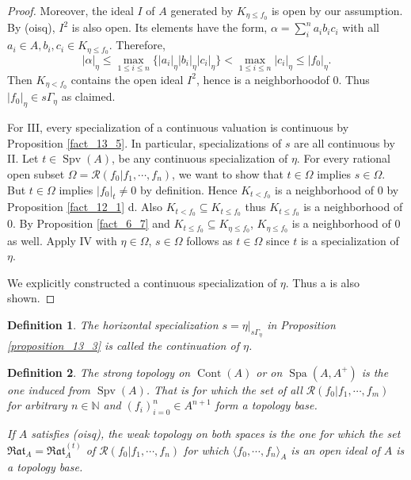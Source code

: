 \documentclass[8pt]{article}
\numberwithin{equation}{section}
\newtheorem{definition}{Definition}[subsection]
\DeclareMathOperator{\Spa}{Spa}
\DeclareMathOperator{\Spv}{Spv}
\DeclareMathOperator{\Cont}{Cont}
\newcommand{\N}[0]{\mathbb{N}}
\newcommand{\cR}[0]{\mathcal{R}}
\newcommand{\ab}[1]{\vert #1 \vert}
\newcommand{\Rat}[0]{\mathfrak{Rat}}
\begin{document}
\begin{proof}
    Moreover, the ideal $I$ of $A$ generated by $K_{\eta\leq f_0}$ is open by our assumption. By (oisq), $I^2$ is also open. Its elements have the form, $\alpha=\sum_i^n a_ib_ic_i$ with all $a_i\in A, b_i,c_i\in K_{\eta\leq f_0}$. Therefore,
    \begin{equation*}
        \ab{\alpha}_\eta\leq\max_{1\leq i\leq n}\{\ab{a_i}_\eta\ab{b_i}_\eta\ab{c_i}_\eta\}<\max_{1\leq i\leq n}\ab{c_i}_\eta\leq\ab{f_0}_\eta.
    \end{equation*}
    Then $K_{\eta<f_0}$ contains the open ideal $I^2$, hence is a neighborhoodof $0$. Thus $\ab{f_0}_\eta\in s\Gamma_\eta$ as claimed.
    \par For III, every specialization of a continuous valuation is continuous by Proposition \ref{fact_13_5}. In particular, specializations of $s$ are all continuous by II. 
    Let $t\in \Spv(A)$, be any continuous specialization of $\eta$. For every rational open subset $\Omega = \cR(f_0|f_1,\cdots,f_n)$, we want to show that $t\in\Omega$ implies $s\in\Omega$. But $t\in\Omega$ implies $\ab{f_0}_t\not=0$ by definition.
    Hence $K_{t< f_0}$ is a neighborhood of $0$ by Proposition \ref{fact_12_1} d. %
    Also $K_{t< f_0}\subseteq K_{t\leq f_0}$ thus $K_{t\leq f_0}$ is a neighborhood of $0$. By Proposition \ref{fact_6_7} and  $K_{t\leq f_0}\subseteq K_{\eta\leq f_0}$, $K_{\eta\leq f_0}$ is a neighborhood of $0$ as well. Apply IV with $\eta\in\Omega$, $s\in\Omega$ follows as $t\in\Omega$ since $t$ is a specialization of $\eta$. 
    \par We explicitly constructed a continuous specialization of $\eta$. Thus a is also shown.
\end{proof}
\begin{definition}
    The horizontal specialization $s = \eta|_{s\Gamma_\eta}$ in Proposition \ref{proposition_13_3} is called the continuation of $\eta$.
\end{definition}
\begin{definition}
    \label{definition_14_5}
    The strong topology on $\Cont(A)$ or on $\Spa(A,A^+)$ is the one induced from $\Spv(A)$. That is for which the set of all $\cR(f_0|f_1,\cdots,f_m)$ for arbitrary $n\in\N$ and $(f_i)_{i=0}^n\in A^{n+1}$ form a topology base. 
    \par If $A$ satisfies (oisq), the weak topology on both spaces is the one for which the set $\Rat_A = \Rat_A^{(t)}$ of $\cR(f_0|f_1,\cdots,f_n)$ for which $\langle f_0,\cdots,f_n\rangle_A$ is an open ideal of $A$ is a topology base.
\end{definition}
\end{document}

